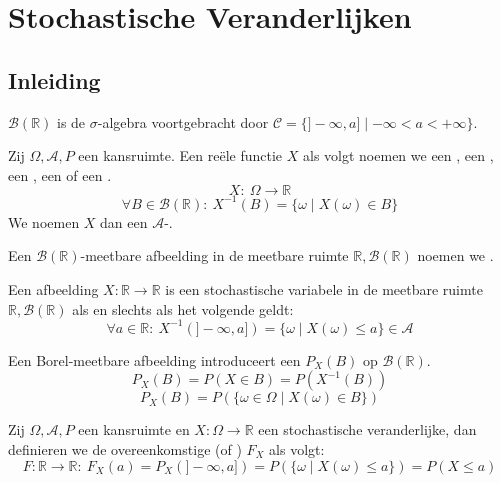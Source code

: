 \documentclass[main.tex]{subfiles}
\begin{document}
\chapter{Stochastische Veranderlijken}
\label{cha:stoch-verand}

\section{Inleiding}
\label{sec:inleiding}

\begin{de}
  $\mathcal{B}(\mathbb{R})$ is de $\sigma$-algebra voortgebracht door $\mathcal{C} = \{ ]-\infty,a]\mid -\infty < a < +\infty \}$.
\end{de}

\begin{de}
  Zij $\Omega, \mathcal{A}, P$ een kansruimte.
  Een re\"ele functie $X$ als volgt noemen we een , een , een , een  of een .
  \[ X:\ \Omega \rightarrow \mathbb{R} \]
  \[ \forall B\in \mathcal{B}(\mathbb{R}):\ X^{-1}(B) = \{\omega \mid X(\omega) \in B \} \]
  We noemen $X$ dan een $\mathcal{A}$-.
  
\end{de}

\begin{de}
  Een $\mathcal{B}(\mathbb{R})$-meetbare afbeelding in de meetbare ruimte $\mathbb{R},\mathcal{B}(\mathbb{R})$ noemen we .
\end{de}

\begin{st}
  Een afbeelding $X: \mathbb{R} \rightarrow \mathbb{R}$ is een stochastische variabele in de meetbare ruimte $\mathbb{R},\mathcal{B}(\mathbb{R})$ als en slechts als het volgende geldt:
  \[ \forall a \in \mathbb{R}:\ X^{-1}(]-\infty,a]) = \{ \omega\mid X(\omega) \le a\} \in \mathcal{A} \]
  \zb
\end{st}

\begin{st}
  Een Borel-meetbare afbeelding introduceert een  $P_{X}(B)$ op $\mathcal{B}(\mathbb{R})$.
  \[ P_{X}(B) = P(X \in B) = P(X^{-1}(B)) \]
  \[ P_{X}(B) = P(\{\omega \in \Omega \mid X(\omega) \in B \}) \]
\end{st}

\begin{de}
  Zij $\Omega,\mathcal{A},P$ een kansruimte en $X: \Omega \rightarrow \mathbb{R}$ een stochastische veranderlijke, dan definieren we de overeenkomstige  (of ) $F_{X}$ als volgt:
  \[ F: \mathbb{R} \rightarrow \mathbb{R}:\ F_{X}(a) = P_{X}(]-\infty,a]) = P(\{\omega\mid X(\omega) \le a\}) = P(X \le a) \]
\end{de}
\end{document}
